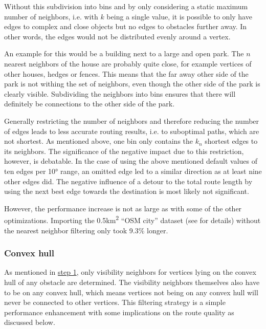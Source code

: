 			Without this subdivision into bins and by only considering a static maximum number of neighbors, i.e. with $k$ being a single value, it is possible to only have edges to complex and close objects but no edges to obstacles further away.
			In other words, the edges would not be distributed evenly around a vertex.
			
			An example for this would be a building next to a large and open park.
			The $n$ nearest neighbors of the house are probably quite close, for example vertices of other houses, hedges or fences.
			This means that the far away other side of the park is not withing the set of neighbors, even though the other side of the park is clearly visible.
			Subdividing the neighbors into bins ensures that there will definitely be connections to the other side of the park.
			
			Generally restricting the number of neighbors and therefore reducing the number of edges leads to less accurate routing results, i.e. to suboptimal paths, which are not shortest.
			As mentioned above, one bin only contains the $k_n$ shortest edges to its neighbors.
			The significance of the negative impact due to this restriction, however, is debatable.
			In the case of using the above mentioned default values of ten edges per 10° range, an omitted edge led to a similar direction as at least nine other edges did.
			The negative influence of a detour to the total route length by using the next best edge towards the destination is most likely not significant.
			
			However, the performance increase is not as large as with some of the other optimizations.
			Importing the 0.5km\textsuperscript{2} \enquote{OSM city} dataset (see  for details) without the nearest neighbor filtering only took 9.3\% longer.
			
		\subsubsection{Convex hull}
		\label{subsubsec:convex-hull}
			
			As mentioned in \hyperref[subsec:step-1-preprocessing]{step 1}, only visibility neighbors for vertices lying on the convex hull of any obstacle are determined.
			The visibility neighbors themselves also have to be on any convex hull, which means vertices not being on any convex hull will never be connected to other vertices.
			This filtering strategy is a simple performance enhancement with some implications on the route quality as discussed below.
			

